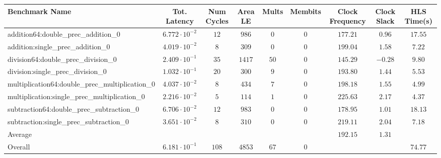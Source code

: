 \begin{tabular}{|l|c|c|c|c|c|c|c|c|}
\hline
Benchmark Name                                   & Tot. Latency            & Num Cycles & Area LE  & Mults  & Membits & Clock Frequency & Clock Slack & HLS Time(s) \\
\hline
addition64:double\_prec\_addition\_0             & $ 6.772 \cdot 10^{-2} $ & $ 12     $ & $ 986  $ & $ 0  $ & $ 0   $ & $ 177.21      $ & $ 0.96    $ & $ 17.55   $ \\
addition:single\_prec\_addition\_0               & $ 4.019 \cdot 10^{-2} $ & $ 8      $ & $ 309  $ & $ 0  $ & $ 0   $ & $ 199.04      $ & $ 1.58    $ & $ 7.22    $ \\
division64:double\_prec\_division\_0             & $ 2.409 \cdot 10^{-1} $ & $ 35     $ & $ 1417 $ & $ 50 $ & $ 0   $ & $ 145.29      $ & $ -0.28   $ & $ 9.80    $ \\
division:single\_prec\_division\_0               & $ 1.032 \cdot 10^{-1} $ & $ 20     $ & $ 300  $ & $ 9  $ & $ 0   $ & $ 193.80      $ & $ 1.44    $ & $ 5.53    $ \\
multiplication64:double\_prec\_multiplication\_0 & $ 4.037 \cdot 10^{-2} $ & $ 8      $ & $ 434  $ & $ 7  $ & $ 0   $ & $ 198.18      $ & $ 1.55    $ & $ 4.99    $ \\
multiplication:single\_prec\_multiplication\_0   & $ 2.216 \cdot 10^{-2} $ & $ 5      $ & $ 114  $ & $ 1  $ & $ 0   $ & $ 225.63      $ & $ 2.17    $ & $ 4.37    $ \\
subtraction64:double\_prec\_subtraction\_0       & $ 6.706 \cdot 10^{-2} $ & $ 12     $ & $ 983  $ & $ 0  $ & $ 0   $ & $ 178.95      $ & $ 1.01    $ & $ 18.13   $ \\
subtraction:single\_prec\_subtraction\_0         & $ 3.651 \cdot 10^{-2} $ & $ 8      $ & $ 310  $ & $ 0  $ & $ 0   $ & $ 219.11      $ & $ 2.04    $ & $ 7.18    $ \\
\hline
Average                                          & $                     $ & $        $ & $      $ & $    $ & $     $ & $ 192.15      $ & $ 1.31    $ & $         $ \\
\hline
Overall                                          & $ 6.181 \cdot 10^{-1} $ & $ 108    $ & $ 4853 $ & $ 67 $ & $ 0   $ & $             $ & $         $ & $ 74.77   $ \\
\hline
\end{tabular}
